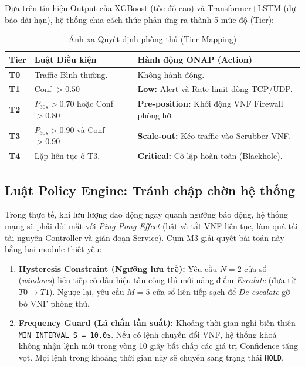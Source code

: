 \documentclass[12pt,a4paper]{article}
\begin{document}
Dựa trên tín hiệu Output của XGBoost (tốc độ cao) và Transformer+LSTM (dự báo dài hạn), hệ thống chia cách thức phản ứng ra thành 5 mức độ (Tier):

\begin{table}[H]
\centering
\caption{Ánh xạ Quyết định phòng thủ (Tier Mapping)}
\label{tab:tier_mapping}
\begin{tabular}{lp{6cm}p{6cm}}
\toprule
\textbf{Tier} & \textbf{Luật Điều kiện} & \textbf{Hành động ONAP (Action)} \\
\midrule
\textbf{T0} & Traffic Bình thường. & Không hành động. \\
\textbf{T1} & Conf $> 0.50$ & \textbf{Low:} Alert và Rate-limit dòng TCP/UDP. \\
\textbf{T2} & $P_{30s} > 0.70$ hoặc Conf $> 0.80$ & \textbf{Pre-position:} Khởi động VNF Firewall phòng hờ. \\
\textbf{T3} & $P_{30s} > 0.90$ và Conf $> 0.90$ & \textbf{Scale-out:} Kéo traffic vào Scrubber VNF. \\
\textbf{T4} & Lặp liên tục ở T3. & \textbf{Critical:} Cô lập hoàn toàn (Blackhole). \\
\bottomrule
\end{tabular}
\end{table}

\subsection{Luật Policy Engine: Tránh chập chờn hệ thống}

Trong thực tế, khi lưu lượng dao động ngay quanh ngưỡng báo động, hệ thống mạng sẽ phải đối mặt với \textit{Ping-Pong Effect} (bật và tắt VNF liên tục, làm quá tải tài nguyên Controller và gián đoạn Service). Cụm M3 giải quyết bài toán này bằng hai module thiết yếu:

\begin{enumerate}[leftmargin=2em]
\item \textbf{Hysteresis Constraint (Ngưỡng lưu trễ):}
Yêu cầu $N=2$ cửa sổ (\textit{windows}) liên tiếp có dấu hiệu tấn công thì mới nâng điểm \textit{Escalate} (đưa từ $T0 \rightarrow T1$). Ngược lại, yêu cầu $M=5$ cửa sổ liên tiếp sạch để \textit{De-escalate} gỡ bỏ VNF phòng thủ.
\item \textbf{Frequency Guard (Lá chắn tần suất):}
Khoảng thời gian nghỉ biến thiên \texttt{MIN\_INTERVAL\_S = 10.0s}. Nếu có lệnh chuyển đổi VNF, hệ thống khoá không nhận lệnh mới trong vòng 10 giây bất chấp các giá trị Confidence tăng vọt. Mọi lệnh trong khoảng thời gian này sẽ chuyển sang trạng thái \texttt{HOLD}.
\end{enumerate}
\end{document}
